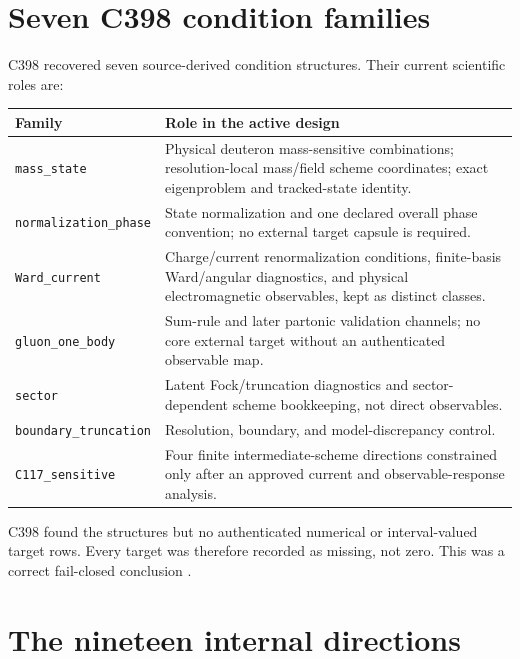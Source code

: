 \documentclass[11pt,oneside]{book}
\begin{document}
\section{Seven C398 condition families}

C398 recovered seven source-derived condition structures.  Their current scientific roles are:
\begin{longtable}{@{}p{}p{}@{}}
\toprule
\textbf{Family}&\textbf{Role in the active design}\\
\midrule
\texttt{mass\_state}&Physical deuteron mass-sensitive combinations; resolution-local mass/field scheme coordinates; exact eigenproblem and tracked-state identity.\\
\texttt{normalization\_phase}&State normalization and one declared overall phase convention; no external target capsule is required.\\
\texttt{Ward\_current}&Charge/current renormalization conditions, finite-basis Ward/angular diagnostics, and physical electromagnetic observables, kept as distinct classes.\\
\texttt{gluon\_one\_body}&Sum-rule and later partonic validation channels; no core external target without an authenticated observable map.\\
\texttt{sector}&Latent Fock/truncation diagnostics and sector-dependent scheme bookkeeping, not direct observables.\\
\texttt{boundary\_truncation}&Resolution, boundary, and model-discrepancy control.\\
\texttt{C117\_sensitive}&Four finite intermediate-scheme directions constrained only after an approved current and observable-response analysis.\\
\bottomrule
\end{longtable}
C398 found the structures but no authenticated numerical or interval-valued target rows.  Every target was therefore recorded as missing, not zero.  This was a correct fail-closed conclusion \cite{DWC398Record2026}.

\section{The nineteen internal directions}
\end{document}
